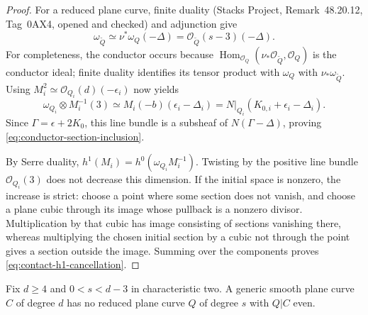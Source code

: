 \begin{proof}
For a reduced plane curve, finite duality (Stacks Project,
Remark~48.20.12, Tag~0AX4, opened and checked) and adjunction give
\[
 \omega_{\widetilde Q}
 \simeq\nu^*\omega_Q(-\Delta)
 =\mathcal O_{\widetilde Q}(s-3)(-\Delta).
\]
For completeness, the conductor occurs because
$\operatorname{Hom}_{\mathcal O_Q}
(\nu_*\mathcal O_{\widetilde Q},\mathcal O_Q)$ is the conductor
ideal; finite duality identifies its tensor product with
$\omega_Q$ with $\nu_*\omega_{\widetilde Q}$.
Using $M_i^2\simeq\mathcal O_{Q_i}(d)(-\epsilon_i)$ now yields
\[
 \omega_{Q_i}\otimes M_i^{-1}(3)
 \simeq M_i(-b)(\epsilon_i-\Delta_i)
 =N|_{Q_i}(K_{0,i}+\epsilon_i-\Delta_i).
\]
Since $\Gamma=\epsilon+2K_0$, this line bundle is a subsheaf
of $N(\Gamma-\Delta)$, proving
\eqref{eq:conductor-section-inclusion}.

By Serre duality, $h^1(M_i)=h^0(\omega_{Q_i}M_i^{-1})$.
Twisting by the positive line bundle $\mathcal O_{Q_i}(3)$
does not decrease this dimension.  If the initial space is nonzero,
the increase is strict: choose a point where some section does not
vanish, and choose a plane cubic through its image whose pullback
is a nonzero divisor.  Multiplication by that cubic has image
consisting of sections vanishing there, whereas multiplying the
chosen initial section by a cubic not through the point gives a
section outside the image.  Summing over the components proves
\eqref{eq:contact-h1-cancellation}.
\end{proof}

\begin{lemma}
\label{lem:no-low-degree-contact}
Fix $d\ge4$ and $0<s<d-3$ in characteristic two.
A generic smooth plane curve $C$ of degree $d$ has no reduced
plane curve $Q$ of degree $s$ with $Q|C$ even.
\end{lemma}

